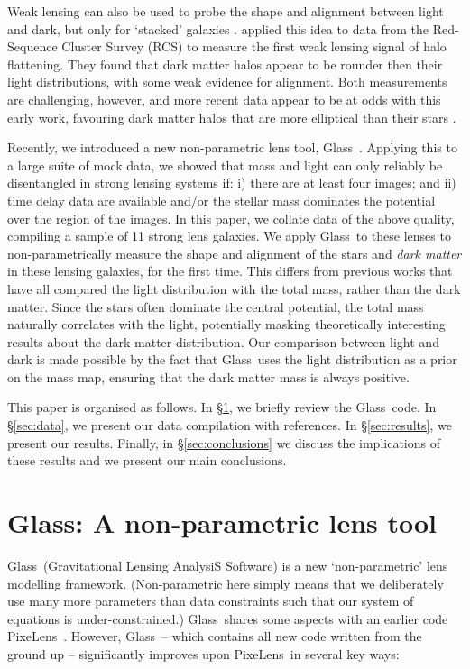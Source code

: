 \documentclass[useAMS,usenatbib]{mn2e}
\def\Glass{{\sc Glass}}
\def\PixeLens{{\sc PixeLens}}
\begin{document}
Weak lensing can also be used to probe the shape and alignment between light and dark, but only for `stacked' galaxies \citep{2000astro.ph..6281B,2000ApJ...538L.113N}. \citet{2004ApJ...606...67H} applied this idea to data from the Red-Sequence Cluster Survey (RCS) to measure the first weak lensing signal of halo flattening. They found that dark matter halos appear to be rounder then their light distributions, with some weak evidence for alignment. Both measurements are challenging, however, and more recent data appear to be at odds with this early work, favouring dark matter halos that are more elliptical than their stars \citep{2006MNRAS.370.1008M,2007ApJ...669...21P,2012A&A...545A..71V}.

Recently, we introduced a new non-parametric lens tool, \Glass\  \citep{2014arXiv1401.7990C}. Applying this to a large suite of mock data, we showed that mass and light can only reliably be disentangled in strong lensing systems if: i) there are at least four images; and ii) time delay data are available and/or the stellar mass dominates the potential over the region of the images. In this paper, we collate data of the above quality, compiling a sample of 11 strong lens galaxies. We apply \Glass\ to these lenses to non-parametrically measure the shape and alignment of the stars and {\it dark matter}  in these lensing galaxies, for the first time. This differs from previous works that have all compared the light distribution with the total mass, rather than the dark matter. Since the stars often dominate the central potential, the total mass naturally correlates with the light, potentially masking theoretically interesting results about the dark matter distribution. Our comparison between light and dark is made possible by the fact that \Glass\ uses the light distribution as a prior on the mass map, ensuring that the dark matter mass is always positive.

This paper is organised as follows. In \S\ref{sec:glass}, we briefly review the \Glass\ code. In \S\ref{sec:data}, we present our data compilation with references. In \S\ref{sec:results}, we present our results. Finally, in \S\ref{sec:conclusions} we discuss the implications of these results and we present our main conclusions.


\section{\Glass: A non-parametric lens tool}\label{sec:glass}

\Glass\ (Gravitational Lensing AnalysiS Software) is a new `non-parametric' lens modelling framework. (Non-parametric here simply means that we deliberately use many more parameters than data constraints such that our system of equations is under-constrained.) \Glass\ shares some aspects
with an earlier code \PixeLens\ \citep{Saha2004,2008ApJ...679...17C}. However,
\Glass\ -- which contains all new code written from the ground up --
significantly improves upon \PixeLens\ in several key ways: 
\end{document}
